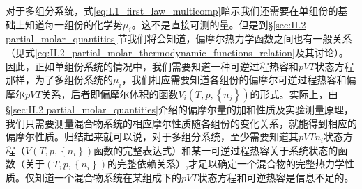 \documentclass[main.tex]{subfiles}
\begin{document}
对于多组分系统，式\eqref{eq:I.1_first_law_multicomp}暗示我们还需要在单组份的基础上知道每一组份的化学势$\mu_i$。这不是直接可测的量。但是到\S\ref{sec:II.2 partial_molar_quantities}节我们将会知道，偏摩尔热力学函数之间也有一般关系（见式\eqref{eq:II.2_partial_molar_thermodynamic_functions_relation}及其讨论）。因此，正如单组份系统的情况中，我们需要知道一种可逆过程热容和$pVT$状态方程那样，为了多组份系统的$\mu_i$，我们相应需要知道各组份的偏摩尔可逆过程热容和偏摩尔$pVT$关系，后者即偏摩尔体积的函数$V_i\left(T,p,\left\{n_j\right\}\right)$的形式。实际上，由\S\ref{sec:II.2 partial_molar_quantities}介绍的偏摩尔量的加和性质及实验测量原理，我们只需要测量混合物系统的相应摩尔性质随各组份的变化关系，就能得到相应的偏摩尔性质。归结起来就可以说，对于多组分系统，至少需要知道其$pVTn_i$状态方程（$V\left(T,p,\left\{n_i\right\}\right)$函数的完整表达式）和某一可逆过程热容关于系统状态的函数（关于$\left(T,p,\left\{n_i\right\}\right)$的完整依赖关系）,才足以确定一个混合物的完整热力学性质。仅知道一个混合物系统在某组成下的$pVT$状态方程和可逆热容是信息不足的。
\end{document}
